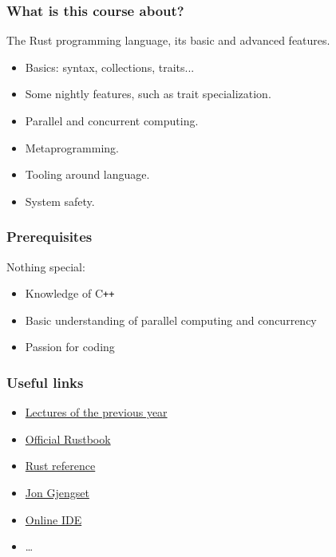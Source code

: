 \documentclass[aspectratio=1610,t]{beamer}
\begin{document}
\begin{frame}[c]
\frametitle{What is this course about?}
The Rust programming language, its basic and advanced features.
\begin{itemize}
    \item Basics: syntax, collections, traits...
    \item Some nightly features, such as trait specialization.
    \item Parallel and concurrent computing.
    \item Metaprogramming.
    \item Tooling around language.
    \item System safety.
\end{itemize}
\end{frame}



\begin{frame}[c]
\frametitle{Prerequisites}
Nothing special:
\begin{itemize}
    \item Knowledge of C\texttt{++}
    \item Basic understanding of parallel computing and concurrency
    \item Passion for coding
\end{itemize}
\end{frame}


\begin{frame}[c]
\frametitle{Useful links}
\begin{itemize}
    \item \href{https://www.youtube.com/watch?v=XDv4I3_4Ubs&list=PL4_hYwCyhAvbeLzi699gqMUA4UaPkcdmJ}{Lectures of the previous year}
    \item \href{https://doc.rust-lang.org/book/}{Official Rustbook}
    \item \href{https://doc.rust-lang.org/stable/reference/}{Rust reference}
    \item \href{https://www.youtube.com/c/JonGjengset/featured}{Jon Gjengset}
    \item \href{https://play.rust-lang.org/}{Online IDE}
    \item \dots
\end{itemize}
\end{frame}

\end{document}
